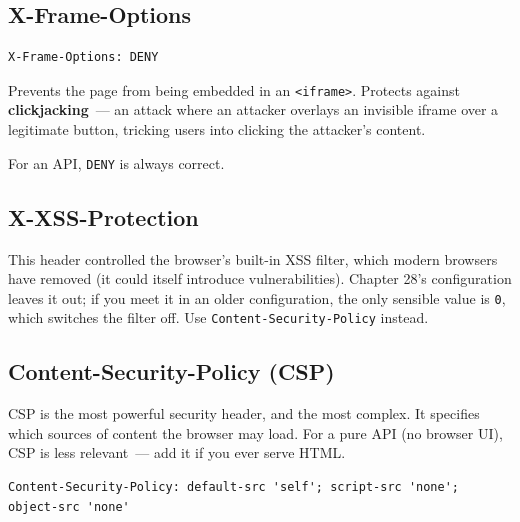 \subsection*{X-Frame-Options}\label{38-security:x-frame-options}

\begin{outputbox}[short]
\begin{Verbatim}[fontsize=\codesize, breaklines, breakanywhere, breaksymbolleft={\tiny\textcolor{muted}{$\hookrightarrow$}}]
X-Frame-Options: DENY
\end{Verbatim}
\end{outputbox}

\noindent{}Prevents the page from being embedded in an \texttt{\textless{}iframe\textgreater{}}. Protects against \textbf{clickjacking}~--- an attack where an attacker overlays an invisible iframe over a legitimate button, tricking users into clicking the attacker's content.

For an API, \texttt{DENY} is always correct.

\subsection*{X-XSS-Protection}\label{38-security:x-xss-protection}

This header controlled the browser's built-in XSS filter, which modern browsers have removed (it could itself introduce vulnerabilities). Chapter 28's configuration leaves it out; if you meet it in an older configuration, the only sensible value is \texttt{0}, which switches the filter off. Use \texttt{Content-Security-Policy} instead.

\subsection*{Content-Security-Policy (CSP)}\label{38-security:content-security-policy-csp}

CSP is the most powerful security header, and the most complex. It specifies which sources of content the browser may load. For a pure API (no browser UI), CSP is less relevant~--- add it if you ever serve HTML.

\begin{outputbox}[short]
\begin{Verbatim}[fontsize=\codesize, breaklines, breakanywhere, breaksymbolleft={\tiny\textcolor{muted}{$\hookrightarrow$}}]
Content-Security-Policy: default-src 'self'; script-src 'none'; object-src 'none'
\end{Verbatim}
\end{outputbox}


